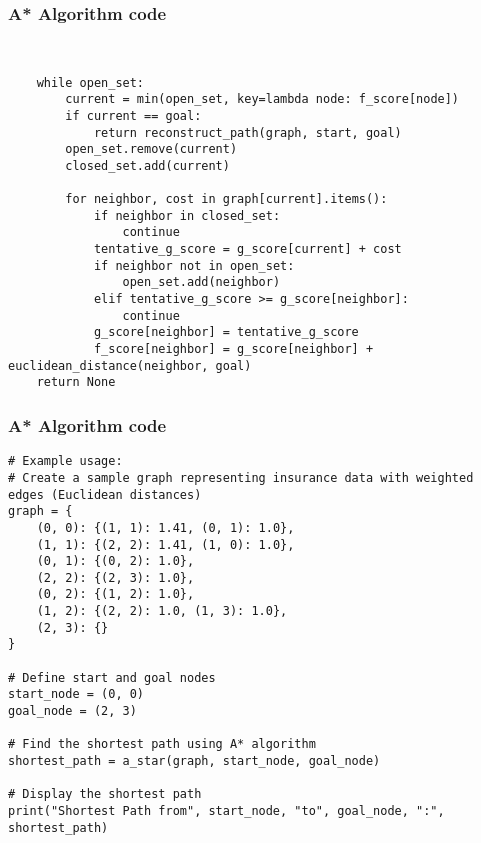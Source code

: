 \begin{frame}[fragile]\frametitle{A* Algorithm code}
{\tiny
\begin{lstlisting}

    
    while open_set:
        current = min(open_set, key=lambda node: f_score[node])
        if current == goal:
            return reconstruct_path(graph, start, goal)
        open_set.remove(current)
        closed_set.add(current)
        
        for neighbor, cost in graph[current].items():
            if neighbor in closed_set:
                continue
            tentative_g_score = g_score[current] + cost
            if neighbor not in open_set:
                open_set.add(neighbor)
            elif tentative_g_score >= g_score[neighbor]:
                continue
            g_score[neighbor] = tentative_g_score
            f_score[neighbor] = g_score[neighbor] + euclidean_distance(neighbor, goal)
    return None
\end{lstlisting}
}
\end{frame}


\begin{frame}[fragile]\frametitle{A* Algorithm code}
{\tiny
\begin{lstlisting}
# Example usage:
# Create a sample graph representing insurance data with weighted edges (Euclidean distances)
graph = {
    (0, 0): {(1, 1): 1.41, (0, 1): 1.0},
    (1, 1): {(2, 2): 1.41, (1, 0): 1.0},
    (0, 1): {(0, 2): 1.0},
    (2, 2): {(2, 3): 1.0},
    (0, 2): {(1, 2): 1.0},
    (1, 2): {(2, 2): 1.0, (1, 3): 1.0},
    (2, 3): {}
}

# Define start and goal nodes
start_node = (0, 0)
goal_node = (2, 3)

# Find the shortest path using A* algorithm
shortest_path = a_star(graph, start_node, goal_node)

# Display the shortest path
print("Shortest Path from", start_node, "to", goal_node, ":", shortest_path)
\end{lstlisting}
}
\end{frame}


